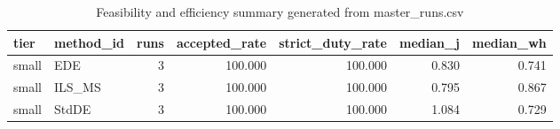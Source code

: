 \begin{table}[!t]
\centering
\caption{Feasibility and efficiency summary generated from master_runs.csv}
\label{tab:feasibility_summary_generated}
\begin{tabular}{llrrrrr}
\toprule
tier & method_id & runs & accepted_rate & strict_duty_rate & median_j & median_wh \\
\midrule
small & EDE & 3 & 100.000 & 100.000 & 0.830 & 0.741 \\
small & ILS_MS & 3 & 100.000 & 100.000 & 0.795 & 0.867 \\
small & StdDE & 3 & 100.000 & 100.000 & 1.084 & 0.729 \\
\bottomrule
\end{tabular}

\end{table}